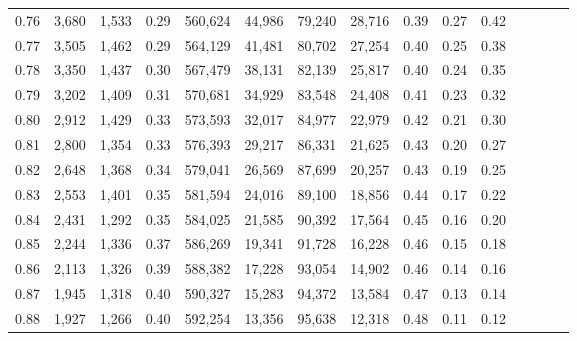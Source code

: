 \begin{tabular}{rrrcrrrrrrrrrrr}
0.76 &   3,680 &  1,533 &                                       0.29 &  560,624 &   44,986 &   79,240 &   28,716 &  0.39 &  0.27 &                         0.42 \\
0.77 &   3,505 &  1,462 &                                       0.29 &  564,129 &   41,481 &   80,702 &   27,254 &  0.40 &  0.25 &                         0.38 \\
0.78 &   3,350 &  1,437 &                                       0.30 &  567,479 &   38,131 &   82,139 &   25,817 &  0.40 &  0.24 &                         0.35 \\
0.79 &   3,202 &  1,409 &                                       0.31 &  570,681 &   34,929 &   83,548 &   24,408 &  0.41 &  0.23 &                         0.32 \\
0.80 &   2,912 &  1,429 &                                       0.33 &  573,593 &   32,017 &   84,977 &   22,979 &  0.42 &  0.21 &                         0.30 \\
0.81 &   2,800 &  1,354 &                                       0.33 &  576,393 &   29,217 &   86,331 &   21,625 &  0.43 &  0.20 &                         0.27 \\
0.82 &   2,648 &  1,368 &                                       0.34 &  579,041 &   26,569 &   87,699 &   20,257 &  0.43 &  0.19 &                         0.25 \\
0.83 &   2,553 &  1,401 &                                       0.35 &  581,594 &   24,016 &   89,100 &   18,856 &  0.44 &  0.17 &                         0.22 \\
0.84 &   2,431 &  1,292 &                                       0.35 &  584,025 &   21,585 &   90,392 &   17,564 &  0.45 &  0.16 &                         0.20 \\
0.85 &   2,244 &  1,336 &                                       0.37 &  586,269 &   19,341 &   91,728 &   16,228 &  0.46 &  0.15 &                         0.18 \\
0.86 &   2,113 &  1,326 &                                       0.39 &  588,382 &   17,228 &   93,054 &   14,902 &  0.46 &  0.14 &                         0.16 \\
0.87 &   1,945 &  1,318 &                                       0.40 &  590,327 &   15,283 &   94,372 &   13,584 &  0.47 &  0.13 &                         0.14 \\
0.88 &   1,927 &  1,266 &                                       0.40 &  592,254 &   13,356 &   95,638 &   12,318 &  0.48 &  0.11 &                         0.12 \\

\end{tabular}
